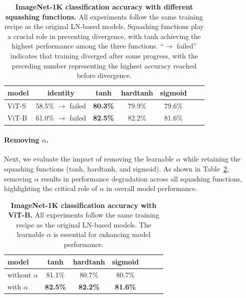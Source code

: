 \begin{table}[h]

\centering
{}
\begin{tabular}{lcccccc}
\toprule
model & identity & tanh & hardtanh & sigmoid \\
\midrule
ViT-S  & 58.5\% $\rightarrow$ failed & \textbf{80.3\%} & 79.9\% & 79.6\% \\
ViT-B  & 61.0\% $\rightarrow$ failed & \textbf{82.5\%} & 82.2\% & 81.6\% \\
\midrule
\end{tabular}
\caption{\textbf{ImageNet-1K classification accuracy with different squashing functions.} All experiments follow the same training recipe as the original LN-based models. Squashing functions play a crucial role in preventing divergence, with tanh achieving the highest performance among the three functions. ``$\rightarrow$ failed'' indicates that training diverged after some progress, with the preceding number representing the highest accuracy reached before divergence.}
\label{tab:function_ablation}
\end{table}

\paragraph{Removing $\alpha$.} Next, we evaluate the impact of removing the learnable $\alpha$ while retaining the squashing functions (tanh, hardtanh, and sigmoid).
As shown in Table~\ref{tab:alpha_ablation}, removing $\alpha$ results in performance degradation across all squashing functions, highlighting the critical role of $\alpha$ in overall model performance.

\begin{table}[h]
\centering
{}
\begin{tabular}{lcccccc}
\toprule
model & tanh & hardtanh & sigmoid \\
\midrule
without $\alpha$ &  81.1\% & 80.7\% & 80.7\% \\
with $\alpha$  & \textbf{82.5\%} & \textbf{82.2\%} & \textbf{81.6\%} \\
\midrule
\end{tabular}
\caption{\textbf{ImageNet-1K classification accuracy with ViT-B.} All experiments follow the same training recipe as the original LN-based models. The learnable $\alpha$ is essential for enhancing model performance.}
\label{tab:alpha_ablation}
\end{table}


